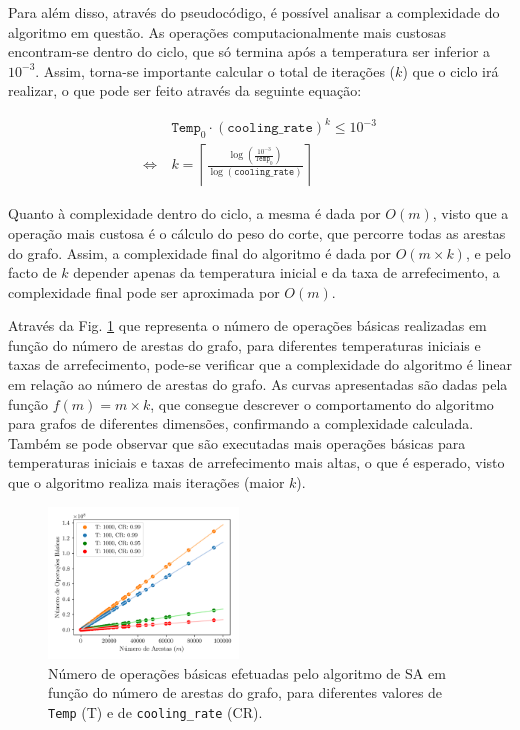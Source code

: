 \documentclass[mirror, portugues]{revdetua}
\begin{document}
Para além disso, através do pseudocódigo, é possível analisar a complexidade do algoritmo em questão. As operações computacionalmente mais custosas encontram-se dentro do ciclo, que só termina após a temperatura ser inferior a $10^{-3}$. Assim, torna-se importante calcular o total de iterações ($k$) que o ciclo irá realizar, o que pode ser feito através da seguinte equação:

\begin{align*}
    &\texttt{Temp}_0 \cdot (\texttt{cooling\_rate})^k \le 10^{-3} \\
    \Leftrightarrow\ & k = \left\lceil \frac{\log\left(\frac{10^{-3}}{\texttt{Temp}_0}\right)}{\log(\texttt{cooling\_rate})} \right\rceil
\end{align*}

\noindent Quanto à complexidade dentro do ciclo, a mesma é dada por $O(m)$, visto que a operação mais custosa é o cálculo do peso do corte, que percorre todas as arestas do grafo. Assim, a complexidade final do algoritmo é dada por $O(m \times k)$, e pelo facto de $k$ depender apenas da temperatura inicial e da taxa de arrefecimento, a complexidade final pode ser aproximada por $O(m)$.

Através da Fig. \ref{fig:sa_ops} que representa o número de operações básicas realizadas em função do número de arestas do grafo, para diferentes temperaturas iniciais e taxas de arrefecimento, pode-se verificar que a complexidade do algoritmo é linear em relação ao número de arestas do grafo. As curvas apresentadas são dadas pela função $f(m) = m \times k$, que consegue descrever o comportamento do algoritmo para grafos de diferentes dimensões, confirmando a complexidade calculada. Também se pode observar que são executadas mais operações básicas para temperaturas iniciais e taxas de arrefecimento mais altas, o que é esperado, visto que o algoritmo realiza mais iterações (maior $k$).

\begin{figure}[H]
    \centering
    \includegraphics[width=0.45\textwidth]{../assets/ops_Simulated .png}
    \caption{Número de operações básicas efetuadas pelo algoritmo de SA em função do número de arestas do grafo, para diferentes valores de \texttt{Temp} (T) e de \texttt{cooling\_rate} (CR).}
    \label{fig:sa_ops}
\end{figure}
\end{document}
